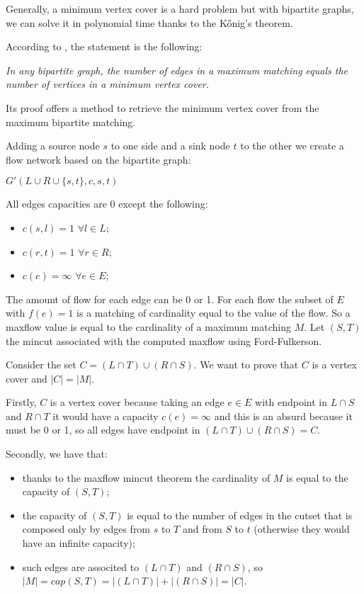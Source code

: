 \documentclass[paper=a4, fontsize=11pt]{scrartcl} %
\numberwithin{equation}{section} %
\numberwithin{figure}{section} %
\numberwithin{table}{section} %
\begin{document}
Generally, a minimum vertex cover is a hard problem but with bipartite graphs, we can solve it in polynomial time thanks to the Kőnig's theorem.

According to \cite{konig_wiki}, the statement is the following:

\bigskip
\textit{In any bipartite graph, the number of edges in a maximum matching equals the number of vertices in a minimum vertex cover.}
\bigskip

Its proof offers a method to retrieve the minimum vertex cover from the maximum bipartite matching.

Adding a source node $s$ to one side and a sink node $t$ to the other we create a flow network based on the bipartite graph:

$G'(L \cup R \cup \{s, t\}, c, s, t)$

All edges capacities are $0$ except the following:

\begin{itemize}
    \item $c(s, l) = 1$  $ \forall l \in L$;
    \item $c(r, t) = 1$  $ \forall r \in R$;
    \item $c(e) = \infty$  $ \forall e \in E$;
\end{itemize}

The amount of flow for each edge can be 0 or 1.
For each flow the subset of $E$ with $f(e) = 1$ is a matching of cardinality equal to the value of the flow.
So a maxflow value is equal to the cardinality of a maximum matching $M$.
Let $(S, T)$ the mincut associated with the computed maxflow using Ford-Fulkerson.

Consider the set $C = (L \cap T) \cup (R \cap S)$. We want to prove that $C$ is a vertex cover and $|C| = |M|$.

Firstly, $C$ is a vertex cover because taking an edge $e \in E$ with endpoint in $L \cap S$ and $R \cap T$ it would have a capacity $c(e) = \infty$ and this is an absurd because it must be 0 or 1, so all edges have endpoint in $(L \cap T) \cup (R \cap S) = C$.

Secondly, we have that:
\begin{itemize}
\item thanks to the maxflow mincut theorem the cardinality of $M$ is equal to the capacity of $(S, T)$;
\item the capacity of $(S, T)$ is equal to the number of edges in the cutset that is composed only by edges from $s$ to $T$ and from $S$ to $t$ (otherwise they would have an infinite capacity);
\item such edges are associted to $(L \cap T)$ and $(R \cap S)$, so $|M| = cap(S, T) = |(L \cap T)| + |(R \cap S)| = |C|$.
\end{itemize}
\end{document}
